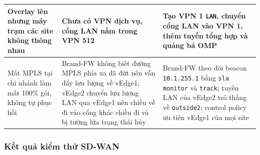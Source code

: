 \begin{longtable}{|P{3.0cm}|P{5.2cm}|P{5.3cm}|}
    \hline
    Overlay lên nhưng máy trạm các site không thông nhau & Chưa có VPN dịch vụ, cổng LAN nằm trong VPN 512 & Tạo VPN 1 \texttt{LAN}, chuyển cổng LAN vào VPN 1, thêm tuyến tổng hợp và quảng bá OMP \\
    \hline
    Mất MPLS tại chi nhánh làm mất 100\% gói, không tự phục hồi & Brand-FW không biết đường MPLS phía xa đã đứt nên vẫn đẩy lưu lượng về vEdge1; vEdge2 chuyển lưu lượng LAN qua vEdge1 nên chiều về đi vào cổng khác chiều đi và bị tường lửa trạng thái hủy & Brand-FW theo dõi beacon \texttt{10.1.255.1} bằng \texttt{sla monitor} và \texttt{track}; tuyến LAN của vEdge2 trỏ thẳng về \texttt{outside2}; control policy ưu tiên vEdge1 của mọi site \\
\end{longtable}
\endgroup

\subsubsection{Kết quả kiểm thử SD-WAN}

